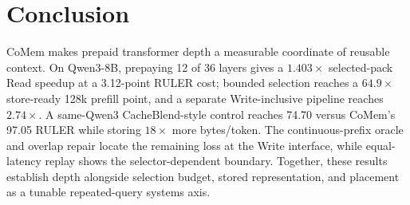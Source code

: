 \section{Conclusion}
\label{sec:conclusion}

CoMem makes prepaid transformer depth a measurable coordinate of reusable
context. On Qwen3-8B, prepaying 12 of 36 layers gives a $1.403\times$
selected-pack Read speedup at a 3.12-point RULER cost; bounded selection reaches
a $64.9\times$ store-ready 128k prefill point, and a separate Write-inclusive
pipeline reaches $2.74\times$. A same-Qwen3 CacheBlend-style control reaches
74.70 versus CoMem's 97.05 RULER while storing $18\times$ more bytes/token.
The continuous-prefix oracle and overlap repair locate the remaining loss at the
Write interface, while equal-latency replay shows the selector-dependent
boundary. Together, these results establish depth alongside selection budget,
stored representation, and placement as a tunable repeated-query systems axis.
